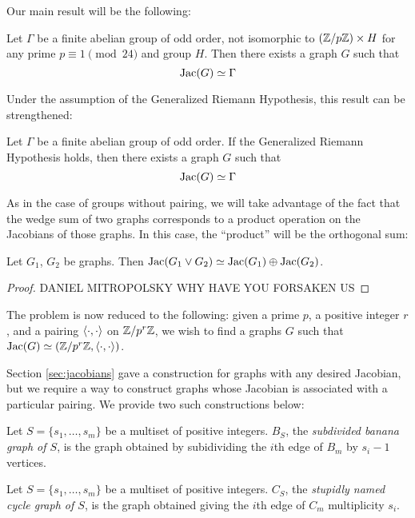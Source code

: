 \documentclass{amsart}
\begin{document}
Our main result will be the following:

\begin{thm}
  Let $\Gamma$ be a finite abelian group of odd order, not isomorphic
  to $(\mathbb{Z}/p\mathbb{Z}) \times H$ for any prime $p \equiv 1 \pmod {24}$ and
  group $H$. Then there exists a graph $G$ such that
  \[
  \operatorname{Jac}(G) \simeq \Gamma
  \]
\end{thm}

Under the assumption of the Generalized Riemann Hypothesis, this
result can be strengthened:
\begin{thm}
  Let $\Gamma$ be a finite abelian group of odd order. If the
  Generalized Riemann Hypothesis holds, then there exists a graph $G$
  such that 
  \[
  \operatorname{Jac}(G) \simeq \Gamma
  \]
\end{thm}

As in the case of groups without pairing, we will take advantage of
the fact that the wedge sum of two graphs corresponds to a product
operation on the Jacobians of those graphs. In this case, the
``product'' will be the orthogonal sum:

\begin{prop}
  \label{prop:wedge_sum}
  Let $G_1$, $G_2$ be graphs. Then $\operatorname{Jac}(G_1 \vee G_2) \simeq
  \operatorname{Jac}(G_1) \oplus \operatorname{Jac}(G_2)$. 
\end{prop}
\begin{proof}
  DANIEL MITROPOLSKY WHY HAVE YOU FORSAKEN US
\end{proof}

The problem is now reduced to the following: given a prime $p$, a
positive integer $r$, and a pairing $\langle \cdot, \cdot \rangle$ on
$\mathbb{Z}/p^r\mathbb{Z}$, we wish to find a graphs $G$ such that $\operatorname{Jac}(G) \simeq
(\mathbb{Z}/p^r\mathbb{Z}, \langle \cdot, \cdot \rangle)$.

Section \ref{sec:jacobians} gave a construction for graphs with any
desired Jacobian, but we require a way to construct graphs whose
Jacobian is associated with a particular pairing. We provide two such
constructions below:

\begin{defn}
  Let $S = \{s_1, \ldots, s_m\}$ be a multiset of positive
  integers. $B_S$, the \emph{subdivided banana graph of $S$}, is the
  graph obtained by subidividing the $i$th edge of $B_m$ by $s_i-1$
  vertices. 
\end{defn}

\begin{defn}
  Let $S = \{s_1, \ldots, s_m\}$ be a multiset of positive
  integers. $C_S$, the \emph{stupidly named cycle graph of $S$}, is
  the graph obtained giving the $i$th edge of $C_m$ multiplicity
  $s_i$.
\end{defn}
\end{document}
